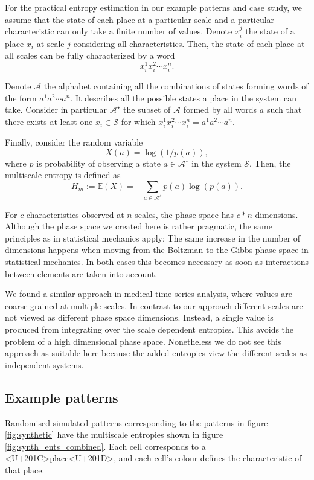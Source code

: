 \documentclass[fleqn,10pt]{wlscirep}
\begin{document}
For the practical entropy estimation in our example patterns and case study, we assume that the state of each place at a particular scale and a particular characteristic can only take a finite number of values. Denote $x_i^j$ the state of a place $x_i$ at scale $j$ considering all characteristics. Then, the state of each place at all scales can be fully characterized by a word $$x_i^1x_i^2\cdots x_i^n.$$

Denote $\mathcal{A}$ the alphabet containing all the combinations of states forming words of the form $a^1a^2\cdots a^n$. It describes all the possible states a place in the system can take. Consider in particular $\mathcal{A}^\star$ the subset of $\mathcal{A}$ formed by all words $a$ such that there exists at least one $x_i\in\mathcal{S}$ for which $x_i^1x_i^2\cdots x_i^n=a^1a^2\cdots a^n$.

Finally, consider the random variable $$X(a)=\log(1/p(a)),$$ where $p$ is probability of observing a state $a\in\mathcal{A}^\star$ in the system $\mathcal{S}$. Then, the multiscale entropy is defined as
$$H_m:=\mathbb{E}(X)=-\sum_{a\in\mathcal{A}^\star}p(a)\log\left(p(a)\right).$$


For $c$ characteristics observed at $n$ scales, the phase space has $c * n$ dimensions. Although the phase space we created here is rather pragmatic, the same principles as in statistical mechanics apply: The same increase in the number of dimensions happens when moving from the Boltzman to the Gibbs phase space in statistical mechanics. In both cases this becomes necessary as soon as interactions between elements are taken into account.

We found a similar approach in medical time series analysis\cite{costa2000multiscale,costa2002multiscale,costa2005multiscale,costa2015generalized,MultiscaleEntropyReview}, where values are coarse-grained  at multiple scales. In contrast to our approach different scales are not viewed as different phase space dimensions. Instead, a single value is produced from integrating over the scale dependent entropies. This avoids the problem of a high dimensional phase space. Nonetheless we do not see this approach as suitable here because the added entropies view the different scales as independent systems.

\subsection*{Example patterns}
Randomised simulated patterns corresponding to the patterns in figure \ref{fig:synthetic} have the multiscale entropies shown in figure \ref{fig:synth_ents_combined}.  Each cell corresponds to a <U+201C>place<U+201D>, and each cell's colour defines the characteristic of that place.
\end{document}
